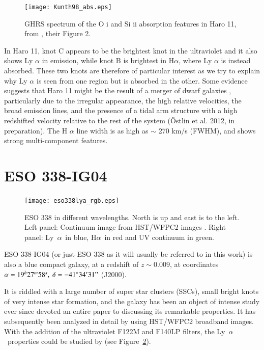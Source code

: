 \documentclass[a4wide,12pt]{book}
\newcommand{\ha}{H${\alpha}$}
\newcommand{\lya}{Ly~${\alpha}$}
\begin{document}
{\begin{figure}
   \centering
   \texttt{[image: Kunth98\_abs.eps]}
   \caption{GHRS spectrum of the O {\sc i} and Si {\sc ii} absorption features in Haro 11, from \citet{kunth-1998}, their Figure 2.}
              \label{Fig:Kunth98Haro11}
    \end{figure}



In Haro 11, knot C appears to be the brightest knot in the ultraviolet and it also shows Ly $\alpha$ in emission, while knot B is brightest in H$\alpha$, where Ly $\alpha$ is instead absorbed. These two knots are therefore of particular interest as we try to explain why Ly $\alpha$ is seen from one region but is absorbed in the other. 
Some evidence suggests that Haro 11 might be the result of a merger of dwarf galaxies \citep{ostlin-2001}, particularly due to the irregular appearance, the high relative velocities, the broad emission lines, and the presence of a tidal arm structure 
with a high redshifted velocity relative to the rest of the system ({\"O}stlin et al. 2012, in preparation). The H $\alpha$ line width is as high as $\sim$ 270 km/s (FWHM), and shows strong multi-component features.  

\section{ESO 338-IG04}

\begin{figure}
   \centering
   \texttt{[image: eso338lya\_rgb.eps]}
   \caption{ESO 338 in different wavelengths. North is up and east is to the left. Left panel: Continuum image from HST/WFPC2 images \citep[see][]{ostlin-1998}. Right panel: \lya\ in blue, \ha\ in red and UV continuum in green.}
              \label{Fig:ESO338_colour}
    \end{figure}

ESO 338-IG04 (or just ESO 338 as it will usually be referred to in this work) is also a blue compact galaxy, at a redshift of $z\sim0.009$, at coordinates $\alpha = 19^h 27^m 58^s,~\delta = -41^\circ 34' 31"$ (J2000). 

It is riddled with a large number of super star clusters (SSCs), small bright knots of very intense star formation, and the galaxy has been an object of intense study ever since \citet{bergvall1985} devoted an entire paper to discussing its remarkable properties. It has subsequently been analyzed in detail by \citet{ostlin-1998,ostlin-2003} using HST/WFPC2 broadband images. With the addition of the ultraviolet F122M and F140LP filters, the \lya\ properties could be studied by \citet{hayes-2005} (see Figure~\ref{Fig:ESO338_colour}).

}
\end{document}
